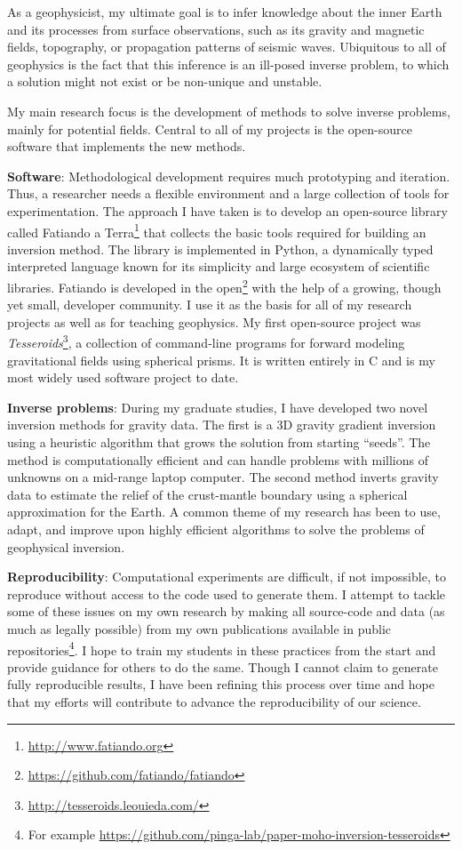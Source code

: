 \documentclass[12pt,notitlepage]{article}
\begin{document}
As a geophysicist,
my ultimate goal is
to infer knowledge about the inner Earth
and its processes
from surface observations,
such as its gravity and magnetic fields,
topography,
or propagation patterns of seismic waves.
%
Ubiquitous to all of geophysics
is the fact that this inference
is an ill-posed inverse problem,
to which a solution might not exist
or be non-unique and unstable.


My main research focus is
the development of methods
to solve inverse problems,
mainly for potential fields.
%
Central to all of my projects
is the open-source software
that implements the new methods.


\textbf{Software}:
Methodological development requires
much prototyping and iteration.
%
Thus,
a researcher needs
a flexible environment
and a large collection of tools
for experimentation.
%
The approach I have taken is
to develop an open-source library
called Fatiando a Terra\footnote{\url{http://www.fatiando.org}}
that collects the basic tools
required for building an inversion method.
%
The library is implemented in Python,
a dynamically typed interpreted language
known for its simplicity
and large ecosystem of scientific libraries.
%
Fatiando is developed in the
open\footnote{\url{https://github.com/fatiando/fatiando}}
with the help of a growing, though yet small,
developer community.
%
I use it as the basis for
all of my research projects
as well as for teaching geophysics.
%
My first open-source project
was \textit{Tesseroids}\footnote{\url{http://tesseroids.leouieda.com/}},
a collection of command-line programs
for forward modeling gravitational fields
using spherical prisms.
%
It is written entirely in C
and is my most widely used software project to date.


\textbf{Inverse problems}:
During my graduate studies,
I have developed two novel inversion methods
for gravity data.
%
The first is a 3D gravity gradient inversion
using a heuristic algorithm
that grows the solution from starting ``seeds''.
%
The method is computationally efficient
and can handle problems with millions of unknowns
on a mid-range laptop computer.
%
The second method inverts gravity data
to estimate the relief
of the crust-mantle boundary
using a spherical approximation for the Earth.
%
A common theme of my research has been
to use, adapt, and improve upon
highly efficient algorithms
to solve the problems of geophysical inversion.


\textbf{Reproducibility}:
Computational experiments
are difficult, if not impossible, to reproduce
without access to the code used to generate them.
%
I attempt to tackle
some of these issues
on my own research
by making all source-code and data
(as much as legally possible)
from my own publications
available in public repositories\footnote{For example \url{https://github.com/pinga-lab/paper-moho-inversion-tesseroids}}.
%
I hope to train my students
in these practices from the start
and provide guidance for others to do the same.
%
Though I cannot claim
to generate fully reproducible results,
I have been refining this process over time
and hope that my efforts will contribute
to advance the reproducibility of our science.
\end{document}
